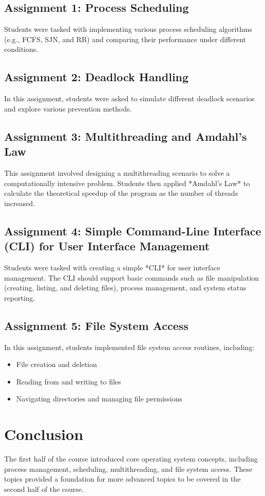 \documentclass[12pt]{article}
\begin{document}
\subsection{Assignment 1: Process Scheduling}
Students were tasked with implementing various process scheduling algorithms (e.g., FCFS, SJN, and RR) and comparing their performance under different conditions.

\subsection{Assignment 2: Deadlock Handling}
In this assignment, students were asked to simulate different deadlock scenarios and explore various prevention methods.

\subsection{Assignment 3: Multithreading and Amdahl's Law}
This assignment involved designing a multithreading scenario to solve a computationally intensive problem. Students then applied *Amdahl's Law* to calculate the theoretical speedup of the program as the number of threads increased.

\subsection{Assignment 4: Simple Command-Line Interface (CLI) for User Interface Management}
Students were tasked with creating a simple *CLI* for user interface management. The CLI should support basic commands such as file manipulation (creating, listing, and deleting files), process management, and system status reporting.

\subsection{Assignment 5: File System Access}
In this assignment, students implemented file system access routines, including:
\begin{itemize}
    \item File creation and deletion
    \item Reading from and writing to files
    \item Navigating directories and managing file permissions
\end{itemize}

\section{Conclusion}
The first half of the course introduced core operating system concepts, including process management, scheduling, multithreading, and file system access. These topics provided a foundation for more advanced topics to be covered in the second half of the course.
\end{document}
